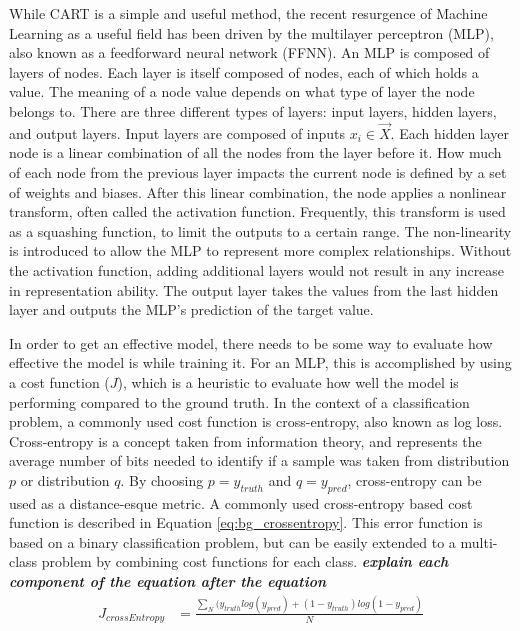 \documentclass[11pt]{report}
\begin{document}
	\par While CART is a simple and useful method, the recent resurgence of Machine Learning as a useful field has been driven by the multilayer perceptron (MLP), also known as a feedforward neural network (FFNN). An MLP is composed of layers of nodes. Each layer is itself composed of nodes, each of which holds a value. The meaning of a node value depends on what type of layer the node belongs to. There are three different types of layers: input layers, hidden layers, and output layers. Input layers are composed of inputs $x_i \in \vec{X}$. Each hidden layer node is a linear combination of all the nodes from the layer before it. How much of each node from the previous layer impacts the current node is defined by a set of weights and biases. After this linear combination, the node applies a nonlinear transform, often called the activation function. Frequently, this transform is used as a squashing function, to limit the outputs to a certain range. The non-linearity is introduced to allow the MLP to represent more complex relationships. Without the activation function, adding additional layers would not result in any increase in representation ability. The output layer takes the values from the last hidden layer and outputs the MLP's prediction of the target value.  
	\par In order to get an effective model, there needs to be some way to evaluate how effective the model is while training it. For an MLP, this is accomplished by using a cost function ($J$), which is a heuristic to evaluate how well the model is performing compared to the ground truth. In the context of a classification problem, a commonly used cost function is cross-entropy, also known as log loss. Cross-entropy is a concept taken from information theory, and represents the average number of bits needed to identify if a sample was taken from distribution $p$ or distribution $q$. By choosing $p=y_{truth}$ and $q=y_{pred}$, cross-entropy can be used as a distance-esque metric. A commonly used cross-entropy based cost function is described in Equation \ref{eq:bg_crossentropy}. This error function is based on a binary classification problem, but can be easily extended to a multi-class problem by combining cost functions for each class.  
	\textbf{\textit{explain each component of the equation after the equation}}
	\begin{align}
		J_{crossEntropy} &= \frac{\sum_N (y_{truth}log(y_{pred}) + (1-y_{truth})log(1-y_{pred}) }{N} \label{eq:bg_crossentropy}
	\end{align}
\end{document}
